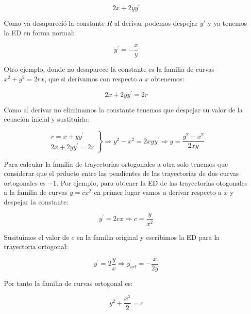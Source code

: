\documentclass[a4paper,12pt,titlepage]{article}
\begin{document}
\begin{equation*}
    2x + 2yy^{\prime}
\end{equation*}

Como ya desapareció la constante $R$ al derivar podemos despejar $y'$ y ya tenemos la ED en forma normal:

\begin{equation*}
    y^{\prime} = -\frac{x}{y}
\end{equation*}

Otro ejemplo, donde no desaparece la constante es la familia de curvas $x^2+y^2=2rx$, que si derivamos con respecto a $x$ obtenemos:

\begin{equation*}
    2x+2yy^{\prime}=2r
\end{equation*}

Como al derivar no eliminamos la constante tenemos que despejar su valor de la ecuación inicial y sustituirla:

\begin{equation*}
    \left. \begin{array}{l}
        r = x+yy^{\prime} \\
        2x+2yy^{\prime}=2r
    \end{array} \right\} \Rightarrow y^2 -x^2 = 2xyy^{\prime} \Rightarrow y= \frac{y^2-x^2}{2xy}
\end{equation*}

Para calcular la familia de trayectorias ortogonales a otra solo tenemos que considerar que el prducto entre las pendientes de las trayectorias de dos curvas ortogonales es $-1$. Por ejemplo, para obtener la ED de las trayectorias otogonales a la familia de curvas $y=cx^2$ en primer lugar vamos a derivar respecto a $x$ y despejar la constante:

\begin{equation*}
    y^{\prime}=2cx \Rightarrow c=\frac{y}{x^2}
\end{equation*}

Susituimos el valor de $c$ en la familia original y escribimos la ED para la trayectoria ortogonal:

\begin{equation*}
    y^{\prime} = 2\frac{y}{x} \Rightarrow y_{ort}^{\prime} = -\frac{x}{2y}
\end{equation*}

Por tanto la familia de curvas ortogonal es:

\begin{equation*}
    y^2+\frac{x^2}{2} = c
\end{equation*}
\end{document}
